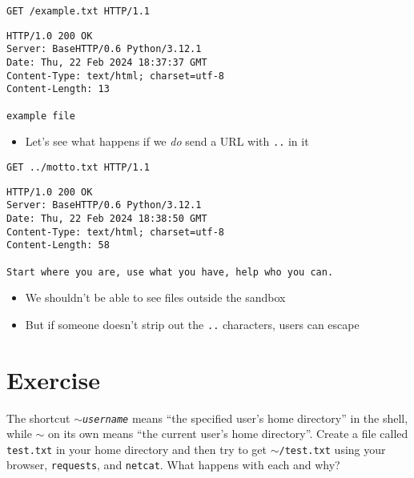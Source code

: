 \documentclass[krantzl]{krantz}
\begin{document}
\begin{lstlisting}[frame=tblr,backgroundcolor=\color{black!5}]
GET /example.txt HTTP/1.1
\end{lstlisting}

\begin{lstlisting}[frame=tblr,backgroundcolor=\color{black!5}]
HTTP/1.0 200 OK
Server: BaseHTTP/0.6 Python/3.12.1
Date: Thu, 22 Feb 2024 18:37:37 GMT
Content-Type: text/html; charset=utf-8
Content-Length: 13

example file
\end{lstlisting}

\begin{itemize}
\item Let’s see what happens if we \emph{do} send a URL with \texttt{..} in it

\end{itemize}
\begin{lstlisting}[frame=tblr,backgroundcolor=\color{black!5}]
GET ../motto.txt HTTP/1.1
\end{lstlisting}

\begin{lstlisting}[frame=tblr,backgroundcolor=\color{black!5}]
HTTP/1.0 200 OK
Server: BaseHTTP/0.6 Python/3.12.1
Date: Thu, 22 Feb 2024 18:38:50 GMT
Content-Type: text/html; charset=utf-8
Content-Length: 58

Start where you are, use what you have, help who you can.
\end{lstlisting}

\begin{itemize}
\item We shouldn’t be able to see files outside the sandbox

\item But if someone doesn’t strip out the \texttt{..} characters, users can escape

\end{itemize}
\section{Exercise}

The shortcut \texttt{$\sim$\emph{username}} means
“the specified user’s home directory” in the shell,
while \texttt{$\sim$} on its own means “the current user’s home directory”.
Create a file called \texttt{test.txt} in your home directory
and then try to get \texttt{$\sim$/test.txt} using your browser,
\texttt{requests},
and \texttt{netcat}.
What happens with each and why?
\end{document}
